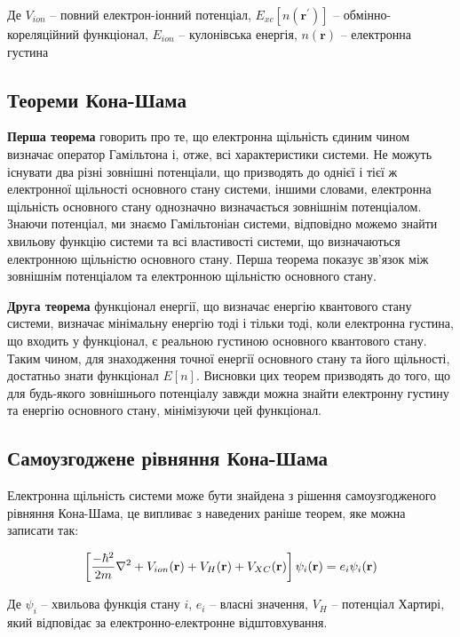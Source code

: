 Де $V_{ion}$ -- повний електрон-іонний потенціал, $E_{xc}[n(\textbf{r}^\prime)]$ -- обмінно-кореляційний функціонал, $E_{ion}$ -- кулонівська енергія, $n(\textbf{r})$ -- електронна густина

\subsection{Теореми Кона-Шама}

\textbf{Перша теорема} говорить про те, що електронна щільність єдиним чином визначає оператор Гамільтона і, отже, всі характеристики системи.
Не можуть існувати два різні зовнішні потенціали, що призводять до однієї і тієї ж електронної щільності основного стану системи, іншими словами, електронна щільність основного стану однозначно визначається зовнішнім потенціалом.
Знаючи потенціал, ми знаємо Гамільтоніан системи, відповідно можемо знайти хвильову функцію системи та всі властивості системи, що визначаються електронною щільністю основного стану. Перша теорема показує зв'язок між зовнішнім потенціалом та електронною щільністю основного стану.

\textbf{Друга теорема} функціонал енергії, що визначає енергію квантового стану системи, визначає мінімальну енергію тоді і тільки тоді, коли електронна густина, що входить у функціонал, є реальною густиною основного квантового стану.
Таким чином, для знаходження точної енергії основного стану та його щільності, достатньо знати функціонал $E[n]$. Висновки цих теорем призводять до того, що для будь-якого зовнішнього потенціалу завжди можна знайти електронну густину та енергію основного стану, мінімізуючи цей функціонал.


\subsection{Самоузгоджене рівняння Кона-Шама}
Електронна щільність системи може бути знайдена з рішення самоузгодженого рівняння Кона-Шама, це випливає з наведених раніше теорем, яке можна записати так:

\begin{equation}
    \left[{{-\hbar^2}\over{2m}}\nabla^2+V_{ion}(\textbf{r})+V_H(\textbf{r})+V_{XC}(\textbf{r})\right]\psi_i(\textbf{r}) = e_i\psi_i(\textbf{r})
\end{equation}

Де $\psi_i$ -- хвильова функція стану $i$, $e_i$ -- власні значення, $V_H$ -- потенціал Хартирі, який відповідає за електронно-електронне відштовхування.


